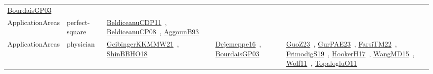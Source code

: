 {\begin{longtable}{lp{3cm}>{\raggedright\arraybackslash}p{6cm}>{\raggedright\arraybackslash}p{6cm}>{\raggedright\arraybackslash}p{8cm}}
\href{../works/BourdaisGP03.pdf}{BourdaisGP03}~\cite{BourdaisGP03}\\
ApplicationAreas & perfect-square & \href{../works/BeldiceanuCDP11.pdf}{BeldiceanuCDP11}~\cite{BeldiceanuCDP11}, \href{../works/BeldiceanuCP08.pdf}{BeldiceanuCP08}~\cite{BeldiceanuCP08}, \href{../works/AggounB93.pdf}{AggounB93}~\cite{AggounB93} &  & \\
ApplicationAreas & physician & \href{../works/GeibingerKKMMW21.pdf}{GeibingerKKMMW21}~\cite{GeibingerKKMMW21}, \href{../works/ShinBBHO18.pdf}{ShinBBHO18}~\cite{ShinBBHO18} & \href{../works/Dejemeppe16.pdf}{Dejemeppe16}~\cite{Dejemeppe16}, \href{../works/BourdaisGP03.pdf}{BourdaisGP03}~\cite{BourdaisGP03} & \href{../works/GuoZ23.pdf}{GuoZ23}~\cite{GuoZ23}, \href{../works/GurPAE23.pdf}{GurPAE23}~\cite{GurPAE23}, \href{../works/FarsiTM22.pdf}{FarsiTM22}~\cite{FarsiTM22}, \href{../works/FrimodigS19.pdf}{FrimodigS19}~\cite{FrimodigS19}, \href{../works/HookerH17.pdf}{HookerH17}~\cite{HookerH17}, \href{../works/WangMD15.pdf}{WangMD15}~\cite{WangMD15}, \href{../works/Wolf11.pdf}{Wolf11}~\cite{Wolf11}, \href{../works/TopalogluO11.pdf}{TopalogluO11}~\cite{TopalogluO11}\\

\end{longtable}}

